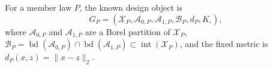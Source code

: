 For a member law \(P\), the known design object is
\[
 G_P=(\mathcal X_P,\mathcal A_{0,P},\mathcal A_{1,P},\mathcal B_P,d_P,K_\square),
\]
where \(\mathcal A_{0,P}\) and \(\mathcal A_{1,P}\) are a Borel partition of \(\mathcal X_P\), \(\mathcal B_P=\operatorname{bd}(\mathcal A_{0,P})\cap\operatorname{bd}(\mathcal A_{1,P})\subset\operatorname{int}(\mathcal X_P)\), and the fixed metric is \(d_P(x,z)=\lVert x-z\rVert_2\).